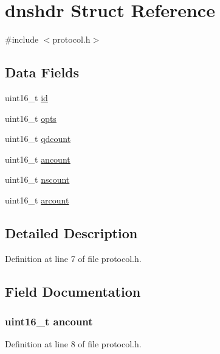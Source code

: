 \hypertarget{structdnshdr}{}\section{dnshdr Struct Reference}
\label{structdnshdr}


{\ttfamily \#include $<$protocol.\+h$>$}

\subsection*{Data Fields}
\begin{DoxyCompactItemize}
\item 
uint16\+\_\+t \hyperlink{structdnshdr_a4fc3a0c58dfbd1e68224521185cb9384}{id}
\item 
uint16\+\_\+t \hyperlink{structdnshdr_a603d5a096df0308ac97dbf3e7d808733}{opts}
\item 
uint16\+\_\+t \hyperlink{structdnshdr_a04016da27d1b8b5859d8527d2742f4f4}{qdcount}
\item 
uint16\+\_\+t \hyperlink{structdnshdr_a2a5577b198ba758438292038bbab5437}{ancount}
\item 
uint16\+\_\+t \hyperlink{structdnshdr_aa613b2dc181144b8d4c975a5260d59e3}{nscount}
\item 
uint16\+\_\+t \hyperlink{structdnshdr_a6eedffaf6f8d915f67e6f6bb77094562}{arcount}
\end{DoxyCompactItemize}


\subsection{Detailed Description}


Definition at line 7 of file protocol.\+h.



\subsection{Field Documentation}
\subsubsection[{\texorpdfstring{ancount}{ancount}}]{\setlength{\rightskip}{0pt plus 5cm}uint16\+\_\+t ancount}\hypertarget{structdnshdr_a2a5577b198ba758438292038bbab5437}{}\label{structdnshdr_a2a5577b198ba758438292038bbab5437}


Definition at line 8 of file protocol.\+h.

